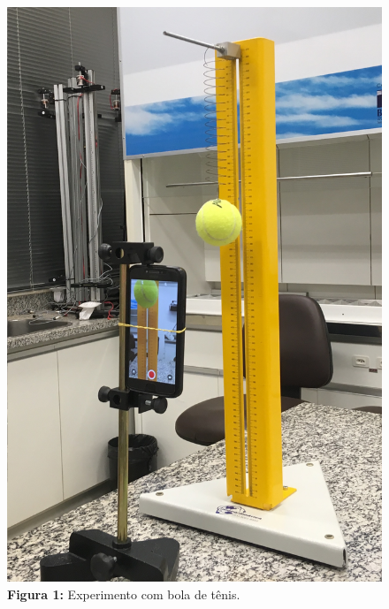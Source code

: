 \documentclass[a4paper, 12pt]{article}
\begin{document}
\begin{multicols}{2}
\begin{figure}[H]
				\includegraphics[scale=0.09]{./img/bolaTenis.jpg}
				\captionsetup{labelformat=empty}
				\caption{\textbf{Figura 1:} Experimento com bola de tênis.}
			\end{figure}
			\begin{figure}[H]
				\centering

\end{figure}
\end{multicols}
\end{document}
